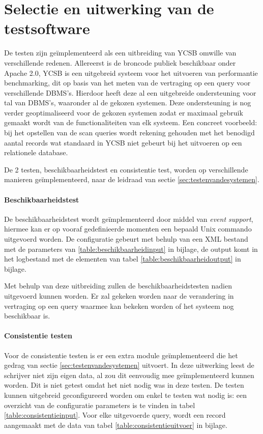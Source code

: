 \section{Selectie en uitwerking van de testsoftware}
De testen zijn geïmplementeerd als een uitbreiding van YCSB\cite{cooper2010benchmarking} omwille van verschillende redenen. Allereerst is de broncode publiek beschikbaar onder Apache 2.0, YCSB is een uitgebreid systeem voor het uitvoeren van performantie benchmarking, dit op basis van het meten van de vertraging op een query voor verschillende DBMS's. Hierdoor heeft deze al een uitgebreide ondersteuning voor tal van DBMS's, waaronder al de gekozen systemen. Deze ondersteuning is nog verder geoptimaliseerd voor de gekozen systemen zodat er maximaal gebruik gemaakt wordt van de functionaliteiten van elk systeem. Een concreet voorbeeld: bij het opstellen van de scan queries wordt rekening gehouden met het benodigd aantal records wat standaard in YCSB niet gebeurt bij het uitvoeren op een relationele database. 

De 2 testen, beschikbaarheidstest en consistentie test, worden op verschillende manieren geïmplementeerd, naar de leidraad van sectie \ref{sec:testenvandesystemen}.  

\paragraph{Beschikbaarheidstest} De beschikbaarheidstest wordt geïmplementeerd door middel van \textit{event support}, hiermee kan er op vooraf gedefinieerde momenten een bepaald Unix commando uitgevoerd worden. De configuratie gebeurt met behulp van een XML bestand met de parameters van \ref{table:beschikbaarheidinput} in bijlage, de output komt in het logbestand met de elementen van tabel \ref{table:beschikbaarheidoutput} in bijlage. 

Met behulp van deze uitbreiding zullen de beschikbaarheidstesten nadien uitgevoerd kunnen worden. Er zal gekeken worden naar de verandering in vertraging op een query waarmee kan bekeken worden of het systeem nog beschikbaar is. 

\paragraph{Consistentie testen} Voor de consistentie testen is er een extra module geïmplementeerd die het gedrag van sectie \ref{sec:testenvandesystemen} uitvoert. In deze uitwerking leest de schrijver niet zijn eigen data, al zou dit eenvoudig mee geïmplementeerd kunnen worden. Dit is niet getest omdat het niet nodig was in deze testen. De testen kunnen uitgebreid geconfigureerd worden om enkel te testen wat nodig is: een overzicht van de configuratie parameters is te vinden in tabel \ref{table:consistentieinput}. Voor elke uitgevoerde query, wordt een record aangemaakt met de data van tabel \ref{table:consistentieuitvoer} in bijlage. 

